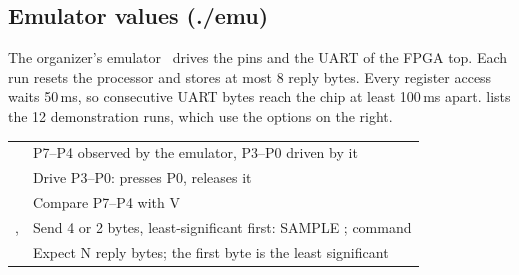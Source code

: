 \subsection{Emulator values (./emu)}\label{sec:emu}
\noindent\begin{minipage}[t]{0.4\linewidth}
\vspace{0pt}\RaggedRight
The organizer's emulator~\cite{repos} drives the pins and the UART of the FPGA top. Each run resets the processor and stores at most 8 reply bytes. Every register access waits 50\,ms, so consecutive UART bytes reach the chip at least 100\,ms apart.  lists the 12 demonstration runs, which use the options on the right.
\end{minipage}\hfill
\begin{minipage}[t]{0.575\linewidth}
\vspace{0pt}
{\tablestyle{}
\begin{tabularx}{\linewidth}{@{}P{17mm}L@{}}
\toprule
{} & P7–P4 observed by the emulator, P3–P0 driven by it\\
 & Drive P3–P0:  presses P0,  releases it\\
 & Compare P7–P4 with V\\
,  & Send 4 or 2 bytes, least-significant first: SAMPLE ; command \\
 & Expect N reply bytes; the first byte is the least significant\\
\bottomrule
\end{tabularx}}
\end{minipage}


